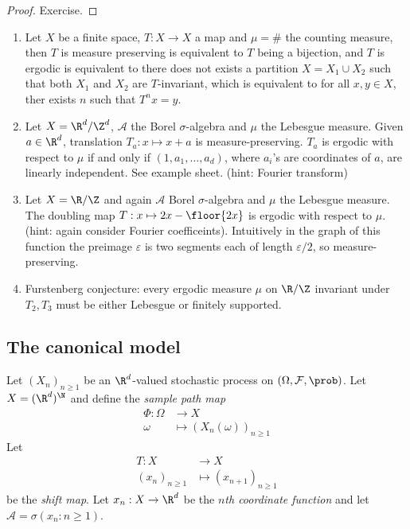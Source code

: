 \documentclass[a4paper]{article}
\renewcommand{\P}{\prob} %
\begin{document}

\begin{proof}
  Exercise.
\end{proof}

\begin{eg}\leavevmode
  \begin{enumerate}
  \item Let \(X\) be a finite space, \(T: X \to X\) a map and \(\mu = \#\) the counting measure, then \(T\) is measure preserving is equivalent to \(T\) being a bijection, and \(T\) is ergodic is equivalent to there does not exists a partition \(X = X_1 \cup X_2\) such that both \(X_1\) and \(X_2\) are \(T\)-invariant, which is equivalent to for all \(x, y \in X\), ther exists \(n\) such that \(T^n x = y\).
  \item Let \(X = \R^d/\Z^d\), \(\mathcal A\) the Borel \(\sigma\)-algebra and \(\mu\) the Lebesgue measure. Given \(a \in \R^d\), translation \(T_a: x \mapsto x + a\) is measure-preserving. \(T_a\) is ergodic with respect to \(\mu\) if and only if \((1, a_1, \dots, a_d)\), where \(a_i\)'s are coordinates of \(a\), are linearly independent. See example sheet. (hint: Fourier transform)
  \item Let \(X = \R/\Z\) and again \(\mathcal A\) Borel \(\sigma\)-algebra and \(\mu\) the Lebesgue measure. The doubling map \(T: x \mapsto 2x - \floor{2x}\) is ergodic with respect to \(\mu\). (hint: again consider Fourier coefficeints). Intuitively in the graph of this function the preimage \(\varepsilon\) is two segments each of length \(\varepsilon/2\), so measure-preserving.
  \item Furstenberg conjecture: every ergodic measure \(\mu\) on \(\R/\Z\) invariant under \(T_2, T_3\) must be either Lebesgue or finitely supported.
  \end{enumerate}
\end{eg}

\subsection{The canonical model}

Let \((X_n)_{n \geq 1}\) be an \(\R^d\)-valued stochastic process on \((\Omega, \mathcal F, \P)\). Let \(X = (\R^d)^\N\) and define the \emph{sample path map}
\begin{align*}
  \Phi: \Omega &\to X \\
  \omega &\mapsto (X_n(\omega))_{n \geq 1}
\end{align*}
Let
\begin{align*}
  T: X &\to X \\
  (x_n)_{n \geq 1} &\mapsto (x_{n + 1})_{n \geq 1}
\end{align*}
be the \emph{shift map}. Let \(x_n: X \to \R^d\) be the \emph{\(n\)th coordinate function} and let \(\mathcal A = \sigma(x_n: n \geq 1)\).
\end{document}
